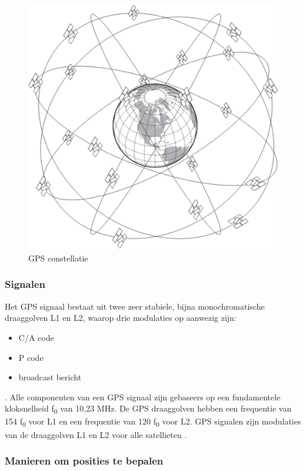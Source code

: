  \begin{figure}[hpb]
 	\includegraphics[scale=1]{GPS.png}
 	\caption{GPS constellatie \cite{LImgGPS}}
 	\label{imgGPS}
 \end{figure}

\subsubsection{Signalen}
Het GPS signaal bestaat uit twee zeer stabiele, bijna monochromatische draaggolven L1 en L2, waarop drie modulaties op aanwezig zijn:
\begin{itemize}
	\item C/A code
	\item P code
	\item broadcast bericht
\end{itemize}. 
Alle componenten van een GPS signaal zijn gebaseers op een fundamentele kloksnelheid f\textsubscript{0} van 10,23 MHz. De GPS draaggolven hebben een frequentie van 154 f\textsubscript{0} voor L1 en een frequentie van 120 f\textsubscript{0} voor L2\cite{LBibGPS2}. GPS signalen zijn modulaties van de draaggolven L1 en L2 voor alle satellieten \cite{LBibGPS3}.

\subsubsection{Manieren om posities te bepalen}
